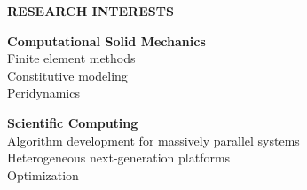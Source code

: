 \documentclass[11pt]{article}
\newlength{\sectionskip} \setlength{\sectionskip}{0.2in}
\newlength{\minipagewidth} \setlength{\minipagewidth}{6.25in} %
\newlength{\myparindent} \setlength{\myparindent}{0.25in}
\begin{document}
\vspace{\sectionskip}
\noindent
{\large \textbf{RESEARCH INTERESTS}}
\vspace{\sectionskip}

\begin{minipage}{\minipagewidth}
\setlength{\parindent}{\myparindent}
\noindent \textbf{Computational Solid Mechanics} \\
\indent Finite element methods \\
\indent Constitutive modeling \\
\indent Peridynamics
\end{minipage}\vspace{\parskip}

\begin{minipage}{\minipagewidth}
\setlength{\parindent}{\myparindent}
\noindent \textbf{Scientific Computing} \\
\indent Algorithm development for massively parallel systems \\
\indent Heterogeneous next-generation platforms \\
\indent Optimization
\end{minipage}

%


\vspace{-0.1in}

\begin{bibunit}[unsrtnat]
  \renewcommand{\refname}{{\large PEER-REVIEWED JOURNAL ARTICLES}}
  \nocite{*}
\end{bibunit}

\vspace{-0.1in}

\begin{bibunit}[unsrtnat]
  \renewcommand{\refname}{{\large BOOK CHAPTERS}}
  \nocite{*}
\end{bibunit}

\vspace{-0.1in}

\begin{bibunit}[unsrtnat]
  \renewcommand{\refname}{{\large CONFERENCE PROCEEDINGS}}
  \nocite{*}
\end{bibunit}

\vspace{-0.1in}

\begin{bibunit}[unsrtnat]
  \renewcommand{\refname}{{\large TECHNICAL REPORTS}}
  \nocite{*}
\end{bibunit}
\end{document}
